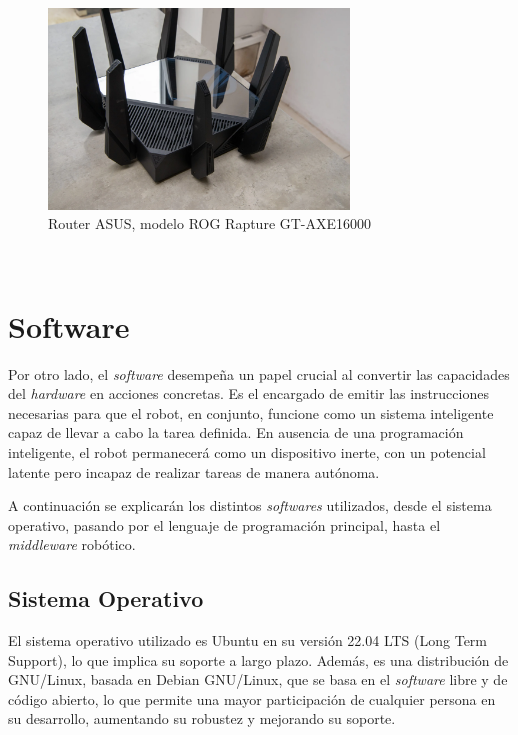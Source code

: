 \begin{figure} [h!]
  \begin{center}
    \includegraphics[width=8cm]{figs/asus_router}
  \end{center}
  \caption{Router ASUS, modelo ROG Rapture GT-AXE16000 \citep{asus_router}}
  \label{fig:asus_router}
\end{figure}\


\section{Software}
\label{sec:software}

Por otro lado, el \textit{software} desempeña un papel crucial al convertir las
capacidades del \textit{hardware} en acciones concretas.
Es el encargado de emitir las instrucciones necesarias para que el robot, en
conjunto, funcione como un sistema inteligente capaz de llevar a cabo la tarea
definida.
En ausencia de una programación inteligente, el robot permanecerá como un
dispositivo inerte, con un potencial latente pero incapaz de realizar tareas de
manera autónoma.

A continuación se explicarán los distintos \textit{softwares} utilizados, desde
el sistema operativo, pasando por el lenguaje de programación principal, hasta
el \textit{middleware} robótico.


\subsection{Sistema Operativo}
\label{sec:sistema_operativo}

El sistema operativo utilizado es Ubuntu en su versión 22.04 LTS (Long Term
Support), lo que implica su soporte a largo plazo.
Además, es una distribución de GNU/Linux, basada en Debian GNU/Linux, que se
basa en el \textit{software} libre y de código abierto, lo que permite una mayor
participación de cualquier persona en su desarrollo, aumentando su robustez y
mejorando su soporte.

